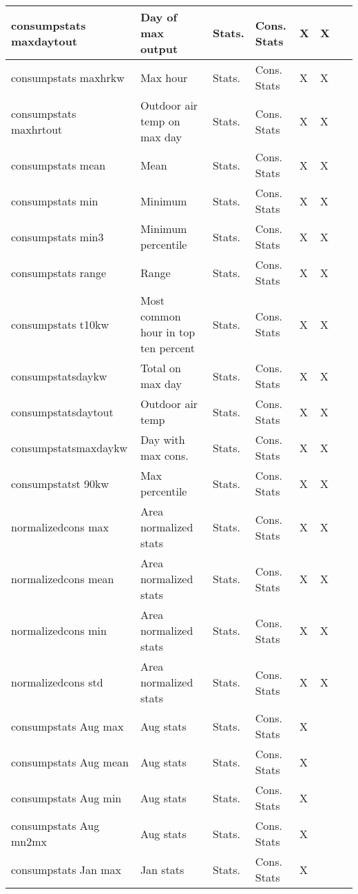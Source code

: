 {{\begin{longtable}[l]{ | p{4cm} | p{4cm} | p{1cm} | p{2cm} | p{0.3cm} | p{0.3cm} | p{0.3cm} |}
	 consumpstats maxdaytout & Day of max output & Stats. & Cons. Stats & X & X & \  \\ \hline
	 consumpstats maxhrkw & Max hour & Stats. & Cons. Stats & X & X & \  \\ \hline
	 consumpstats maxhrtout & Outdoor air temp on max day & Stats. & Cons. Stats & X & X & \  \\ \hline
	 consumpstats mean & Mean & Stats. & Cons. Stats & X & X & \  \\ \hline
	 consumpstats min & Minimum & Stats. & Cons. Stats & X & X & \  \\ \hline
	 consumpstats min3 & Minimum percentile & Stats. & Cons. Stats & X & X & \  \\ \hline
	 consumpstats range & Range & Stats. & Cons. Stats & X & X & \  \\ \hline
	 consumpstats t10kw & Most common hour in top ten percent & Stats. & Cons. Stats & X & X & \  \\ \hline
	 consumpstatsdaykw & Total on max day & Stats. & Cons. Stats & X & X & \  \\ \hline
	 consumpstatsdaytout & Outdoor air temp & Stats. & Cons. Stats & X & X & \  \\ \hline
	 consumpstatsmaxdaykw & Day with max cons. & Stats. & Cons. Stats & X & X & \  \\ \hline
	 consumpstatst 90kw & Max percentile & Stats. & Cons. Stats & X & X & \  \\ \hline
	 normalizedcons max & Area normalized stats & Stats. & Cons. Stats & X & X & \  \\ \hline
	 normalizedcons mean & Area normalized stats & Stats. & Cons. Stats & X & X & \  \\ \hline
	 normalizedcons min & Area normalized stats & Stats. & Cons. Stats & X & X & \  \\ \hline
	 normalizedcons std & Area normalized stats & Stats. & Cons. Stats & X & X & \  \\ \hline
	 consumpstats Aug max & Aug stats & Stats. & Cons. Stats & X & \  & \  \\ \hline
	 consumpstats Aug mean & Aug stats & Stats. & Cons. Stats & X & \  & \  \\ \hline
	 consumpstats Aug min & Aug stats & Stats. & Cons. Stats & X & \  & \  \\ \hline
	 consumpstats Aug mn2mx & Aug stats & Stats. & Cons. Stats & X & \  & \  \\ \hline
	 consumpstats Jan max & Jan stats & Stats. & Cons. Stats & X & \  & \  \\ \hline

\end{longtable}}}

